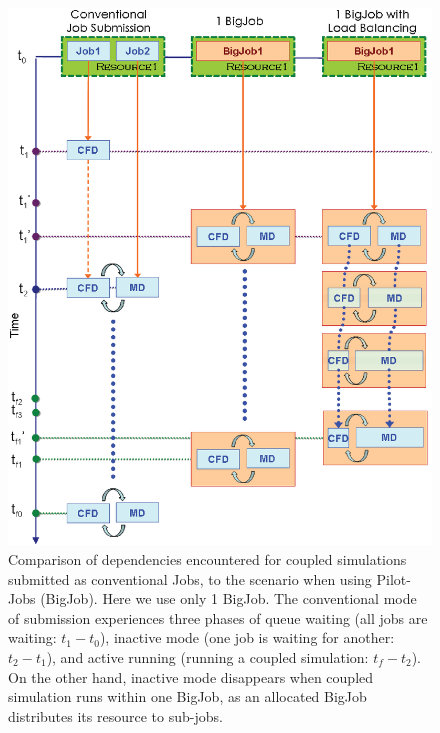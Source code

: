 \documentclass[conference,final]{IEEEtran}
\newcommand{\skonote}[1]{ {\textcolor{blue} { ***Jeff: #1 }}}
\newcommand{\skonote}[1]{}
\begin{document}
\begin{figure}
\centering
\includegraphics[scale=0.40]{Simulation_Time_of_One_BigJob.eps}
\caption{\small Comparison of dependencies encountered for
  coupled simulations submitted as conventional Jobs, to the scenario
  when using Pilot-Jobs (BigJob). Here we use only 1 BigJob. The
  conventional mode of submission experiences three phases of queue
  waiting (all jobs are waiting: $t_1-t_0$), inactive mode (one job is
  waiting for another: $t_2-t_1$), and active running (running a
  coupled simulation: $t_f-t_2$). On the other hand, inactive mode
  disappears when coupled simulation runs within one BigJob, as an
  allocated BigJob distributes its resource to sub-jobs.}
\label{Fig:OneBJ_Flow}
\end{figure}


\end{document}
